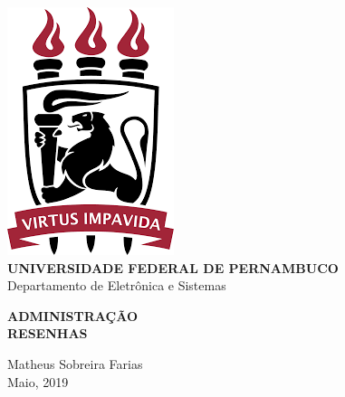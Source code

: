 \documentclass[oneside]{book}
\date{\vspace{-5ex}}
\theoremstyle{definition}
\begin{document}

    \begin{titlepage}
        \centering 
        \includegraphics[scale = 0.8]{ufpe.png} \\
        \Large{\textbf{UNIVERSIDADE FEDERAL DE PERNAMBUCO}}\\
        \large{Departamento de Eletrônica e Sistemas}
   
        \Huge\textbf{ADMINISTRAÇÃO}\\
        \Large\textbf{RESENHAS}
   
        \vfill
        \Large{Matheus Sobreira Farias} \\
        \Large{Maio, 2019}
    \end{titlepage}
\tableofcontents
{}
\mainmatter
\end{document}
